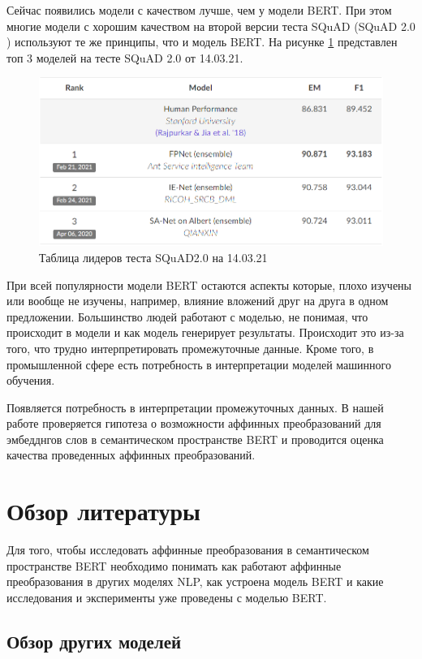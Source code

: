 \documentclass[a4paper,14pt]{article}
\begin{document}
	Сейчас появились модели с качеством лучше, чем у модели BERT. 
	При этом многие модели с хорошим качеством на второй версии теста SQuAD \cite{SQuAD} (SQuAD 2.0 \cite{SQuAD2}) используют те же принципы, что и модель BERT.
	На рисунке \ref{fig:quality140321} представлен топ 3 моделей на тесте SQuAD 2.0 \cite{SQuAD2} от 14.03.21.
	
	\begin{figure}[H]
		\centering
		\includegraphics[width=0.6\linewidth]{images/quality_14_03_21}
		\caption{Таблица лидеров теста SQuAD2.0 на 14.03.21}
		\label{fig:quality140321}
	\end{figure}

	При всей популярности модели BERT остаются аспекты которые, плохо изучены или вообще не изучены, например, влияние вложений друг на друга в одном предложении.
	Большинство людей работают с моделью, не понимая, что происходит в модели и как модель генерирует результаты.
	Происходит это из-за того, что трудно интерпретировать промежуточные данные.
	Кроме того, в промышленной сфере есть потребность в интерпретации моделей машинного обучения.
	
	Появляется потребность в интерпретации промежуточных данных.
	В нашей работе проверяется гипотеза о возможности аффинных преобразований для эмбедднгов слов в семантическом пространстве BERT и проводится оценка качества проведенных аффинных преобразований.
	
	
	

	\pagebreak
	
	\section{Обзор литературы}
	
	Для того, чтобы исследовать аффинные преобразования в семантическом пространстве BERT необходимо понимать как работают аффинные преобразования в других моделях NLP, как устроена модель BERT и какие исследования и эксперименты уже проведены с моделью BERT.
	
	\subsection{Обзор других моделей}
	
\end{document}
